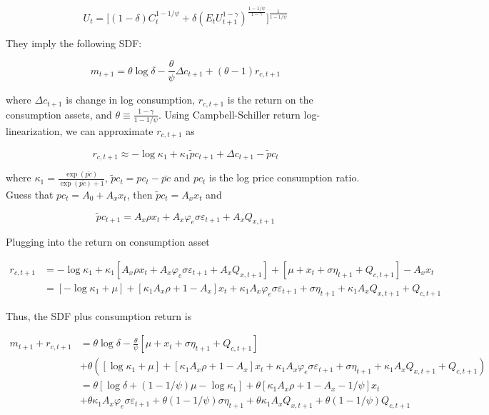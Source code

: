\documentclass{article}
\begin{document}
\begin{enumerate}
$$
U_t = \Bigg[ (1-\delta) C_t^{1-1/\psi} + \delta (E_t U_{t+1}^{1-\gamma})^{\frac{1 - 1/\psi}{1- \gamma}} \Bigg]^{\frac{1}{1-1/\psi}}
$$

They imply the following SDF:

$$
m_{t+1} = \theta \log \delta - \frac{\theta}{\psi} \Delta c_{t+1} + (\theta - 1) r_{c,t+1}
$$

where $\Delta c_{t+1}$ is change in log consumption, $r_{c,t+1}$ is the return on the consumption assets, and $\theta \equiv \frac{1-\gamma}{1-1/\psi}$. Using Campbell-Schiller return log-linearization, we can approximate $r_{c,t+1}$ as

$$
r_{c,t+1} \approx - \log \kappa_1 + \kappa_1 \tilde pc_{t+1} + \Delta c_{t+1} - \tilde pc_t
$$

where $\kappa_1 = \frac{\exp(\bar{pc})}{\exp(\bar{pc}) + 1}$, $\tilde pc_t = pc_t - \bar{pc}$ and $pc_t$ is the log price consumption ratio.  Guess that $pc_t = A_0 + A_x x_t$, then $\tilde pc_t = A_x x_t$ and 

$$
\tilde pc_{t+1} = A_x \rho x_t + A_x\varphi_e \sigma \varepsilon_{t+1} + A_x Q_{x,t+1}
$$

Plugging into the return on consumption asset

\begin{align*}
r_{c,t+1} 
&= -\log \kappa_1 + \kappa_1 [A_x \rho x_t + A_x\varphi_e \sigma \varepsilon_{t+1} + A_x Q_{x,t+1}] + [\mu + x_t + \sigma \eta_{t+1} + Q_{c,t+1}] - A_x x_t\\
&= [-\log \kappa_1 + \mu] + [\kappa_1 A_x \rho  + 1 - A_x] x_t + \kappa_1 A_x \varphi_e \sigma \varepsilon_{t+1} + \sigma \eta_{t+1} + \kappa_1 A_x Q_{x,t+1} + Q_{c,t+1}
\end{align*}

Thus, the SDF plus consumption return is

\begin{align*}
m_{t+1} + r_{c,t+1}
&= \theta \log \delta - \frac{\theta}{\psi} [\mu + x_t + \sigma \eta_{t+1} + Q_{c,t+1}] \\
&+ \theta ([\log \kappa_1 + \mu] + [\kappa_1 A_x \rho  + 1 - A_x] x_t + \kappa_1 A_x \varphi_e \sigma \varepsilon_{t+1} + \sigma \eta_{t+1} + \kappa_1 A_x Q_{x,t+1} + Q_{c,t+1})\\
&= \theta[ \log \delta + (1-1/\psi)\mu - \log \kappa_1]
+ \theta [\kappa_1 A_x \rho  + 1 - A_x - 1/\psi] x_t \\
&+ \theta  \kappa_1 A_x \varphi_e \sigma \varepsilon_{t+1}
+ \theta (1-1/\psi) \sigma \eta_{t+1}
+ \theta \kappa_1 A_x Q_{x,t+1} 
+ \theta (1- 1/\psi) Q_{c,t+1}
\end{align*}



\end{enumerate}
\end{document}
